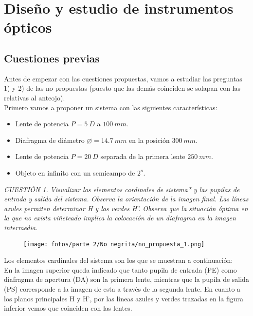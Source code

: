 \documentclass[11pt]{article}
\begin{document}
\clearpage
\section{Diseño y estudio de instrumentos ópticos}
    \vspace{-0.2cm}
    \subsection{Cuestiones previas}
    \noindent Antes de empezar con las cuestiones propuestas, vamos a estudiar las preguntas 1) y 2) de las no propuestas (puesto que las demás coinciden se solapan con las relativas al anteojo).
    \\
    \noindent Primero vamos a proponer un sistema con las siguientes características:
    \begin{itemize}
        \item Lente de potencia $P = 5\ D$ a $100\ mm$.
        \item Diafragma de diámetro $\varnothing = 14.7\ mm$ en la posición $300\ mm$.
        \item Lente de potencia $P = 20\ D$ separada de la primera lente $250\ mm$.
        \item Objeto en infinito con un semicampo de $2^o$.
    \end{itemize}
    \vspace{0.2cm}
    \textit{CUESTIÓN 1. Visualizar los elementos cardinales de sistema* y las pupilas de entrada y salida del sistema. Observa la orientación de la imagen final. Las líneas azules permiten determinar H y las verdes H’. Observa que la situación óptima en la que no exista viñeteado implica la colocación de un diafragma en la imagen intermedia.}
    \\
    
    \begin{figure}
                \vspace{-0.54cm}
                \centering
                \texttt{[image: fotos/parte 2/No negrita/no\_propuesta\_1.png]}
            \end{figure}
    \noindent Los elementos cardinales del sistema son los que se muestran a continuación:\\ 
    
    \noindent En la imagen superior queda indicado que tanto pupila de entrada (PE) como diafragma de apertura (DA) son la primera lente, mientras que la pupila de salida (PS) corresponde a la imagen de esta a través de la segunda lente. En cuanto a los planos principales H y H', por las líneas azules y verdes trazadas en la figura inferior vemos que coinciden con las lentes.\\
    
\end{document}
